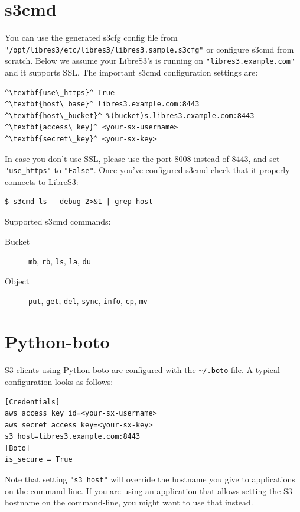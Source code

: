 \section*{s3cmd}

You can use the generated s3cfg config file from\\
\verb|"/opt/libres3/etc/libres3/libres3.sample.s3cfg"| or
configure s3cmd from scratch. Below we assume your LibreS3's
is running on \verb|"libres3.example.com"| and it supports SSL.
The important s3cmd configuration settings are:

\small
\begin{lstlisting}
^\textbf{use\_https}^ True
^\textbf{host\_base}^ libres3.example.com:8443
^\textbf{host\_bucket}^ %(bucket)s.libres3.example.com:8443
^\textbf{access\_key}^ <your-sx-username>
^\textbf{secret\_key}^ <your-sx-key>
\end{lstlisting}
\LARGE

In case you don't use SSL, please use the port 8008 instead of 8443, and set
\verb|"use_https"| to \verb|"False"|. Once you've configured s3cmd check
that it properly connects to LibreS3:
\small
\begin{lstlisting}
$ s3cmd ls --debug 2>&1 | grep host
\end{lstlisting}
\LARGE

Supported s3cmd commands:
\begin{description}
    \item[Bucket] \verb|mb|, \verb|rb|, \verb|ls|, \verb|la|, \verb|du|
    \item[Object] \verb|put|, \verb|get|, \verb|del|, \verb|sync|, \verb|info|,
        \verb|cp|, \verb|mv|
\end{description}

\section*{Python-boto}

S3 clients using Python boto are configured with the \verb|~/.boto| file.
A typical configuration looks as follows:
\small
\begin{lstlisting}
[Credentials]
aws_access_key_id=<your-sx-username>
aws_secret_access_key=<your-sx-key>
s3_host=libres3.example.com:8443
[Boto]
is_secure = True
\end{lstlisting}
\LARGE

Note that setting \verb|"s3_host"| will override the hostname you give to
applications on the command-line. If you are using an application that allows
setting the S3 hostname on the command-line, you might want to use that instead.


